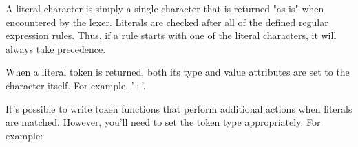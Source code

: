 A literal character is simply a single character that is returned "as is" when
encountered by the lexer. Literals are checked after all of the defined regular
expression rules. Thus, if a rule starts with one of the literal characters, it
will always take precedence.

When a literal token is returned, both its type and value attributes are set to
the character itself. For example, '+'.

It's possible to write token functions that perform additional actions when
literals are matched. However, you'll need to set the token type appropriately.
For example:

\secup
